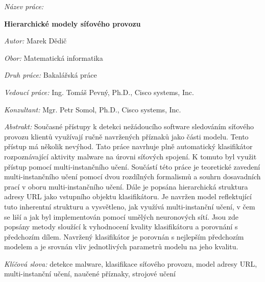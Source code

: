 \begin{onehalfspace}
	\noindent \textit{Název práce:}

	\noindent \textbf{Hierarchické modely síťového provozu}
\end{onehalfspace}

\bigskip

\noindent \textit{Autor:} Marek Dědič

\bigskip

\noindent \textit{Obor:} Matematická informatika

\bigskip

\noindent \textit{Druh práce:} Bakalářská práce

\bigskip

\noindent \textit{Vedoucí práce:} Ing. Tomáš Pevný, Ph.D., Cisco systems, Inc.

\bigskip

\noindent \textit{Konzultant:} Mgr. Petr Somol, Ph.D., Cisco systems, Inc.

\bigskip

\noindent \textit{Abstrakt:}
Současné přístupy k detekci nežádoucího software sledováním síťového provozu klientů využívají ručně navržených příznaků jako části modelu. Tento přístup má několik nevýhod. Tato práce navrhuje plně automatický klasifikátor rozpoznávající aktivity malware na úrovni síťových spojení. K tomuto byl využit přístup pomocí multi-instančního učení. Součástí této práce je teoretické zavedení multi-instančního učení pomocí dvou rozdílných formalismů a souhrn dosavadních prací v oboru multi-instančního učení. Dále je popsána hierarchická struktura adresy URL jako vstupního objektu klasifikátoru. Je navržen model reflektující tuto inherentní strukturu a vysvětleno, jak využívá multi-instanční učení, v čem se liší a jak byl implementován pomocí umělých neuronových sítí. Jsou zde popsány metody sloužící k vyhodnocení kvality klasifikátoru a porovnání s předchozím dílem. Navržený klasifikátor je porovnán s nejlepším předchozím modelem a je srovnán vliv jednotlivých parametrů modelu na jeho kvalitu.

\bigskip

\noindent \textit{Klíčová slova:}
detekce malware, klasifikace síťového provozu, model adresy URL, multi-instanční učení, naučené příznaky, strojové učení

\vfill

